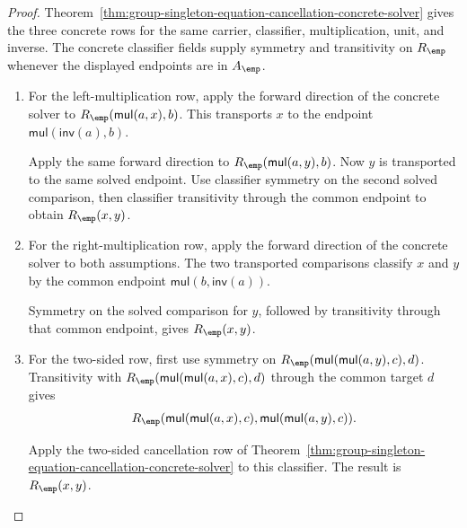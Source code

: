 \begin{proof}
Theorem~\ref{thm:group-singleton-equation-cancellation-concrete-solver} gives
the three concrete rows for the same carrier, classifier, multiplication, unit,
and inverse. The concrete classifier fields supply symmetry and transitivity on
$R_{\emp}$ whenever the displayed endpoints are in $A_{\emp}$.

\begin{enumerate}
  \item For the left-multiplication row, apply the forward direction of the
  concrete solver to $R_{\emp}(\mathsf{mul}(a,x),b)$. This transports $x$ to
  the endpoint $\mathsf{mul}(\mathsf{inv}(a),b)$.

  Apply the same forward direction to $R_{\emp}(\mathsf{mul}(a,y),b)$. Now
  $y$ is transported to the same solved endpoint. Use classifier symmetry on the
  second solved comparison, then classifier transitivity through the common
  endpoint to obtain $R_{\emp}(x,y)$.

  \item For the right-multiplication row, apply the forward direction of the
  concrete solver to both assumptions. The two transported comparisons classify
  $x$ and $y$ by the common endpoint
  $\mathsf{mul}(b,\mathsf{inv}(a))$.

  Symmetry on the solved comparison for $y$, followed by transitivity through
  that common endpoint, gives $R_{\emp}(x,y)$.

  \item For the two-sided row, first use symmetry on
  $R_{\emp}(\mathsf{mul}(\mathsf{mul}(a,y),c),d)$. Transitivity with
  $R_{\emp}(\mathsf{mul}(\mathsf{mul}(a,x),c),d)$ through the common target
  $d$ gives
  $$
  R_{\emp}(\mathsf{mul}(\mathsf{mul}(a,x),c),
  \mathsf{mul}(\mathsf{mul}(a,y),c)).
  $$

  Apply the two-sided cancellation row of
  Theorem~\ref{thm:group-singleton-equation-cancellation-concrete-solver} to
  this classifier. The result is $R_{\emp}(x,y)$.
\end{enumerate}
\end{proof}
